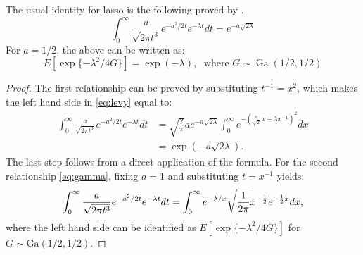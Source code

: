 \documentclass[letterpaper,11pt]{article}
\begin{document}
\begin{remark}
The usual identity for lasso is the following proved by \citet{levy1940certains}.
\begin{equation}
  \int_{0}^{\infty} \frac{a}{\sqrt{2\pi t^3}} e^{-a^2/2t} e^{-\lambda t} dt = e^{-a\sqrt{2\lambda}} \label{eq:levy}
\end{equation}
For $a = 1/2$, the above can be written as: 
\begin{equation}
  E \left[\exp\{-\lambda^2/4 G \} \right] = \exp(-\lambda), \; \text{ where } G \sim \operatorname{Ga} (1/2, 1/2) \label{eq:gamma}
\end{equation}
\end{remark}
\begin{proof}
The first relationship can be proved by substituting $t^{-1} = x^2$, which makes the left hand side in \eqref{eq:levy} equal to: 
\begin{align*}
\int_{0}^{\infty} \frac{a}{\sqrt{2\pi t^3}} e^{-a^2/2t} e^{-\lambda t} dt & = \sqrt{\frac{2}{\pi}} a e^{-a\sqrt{2\lambda}} \int_0^{\infty} e^{-\left(\frac{a}{\sqrt{2}} x - \lambda x^{-1}\right)^2} dx \\
& = \exp(-a\sqrt{2\lambda}).
\end{align*}
The last step follows from a direct application of the \CS formula. For the second relationship \eqref{eq:gamma}, fixing $a = 1$ and substituting $t = x^{-1}$ yields: 
$$
\int_{0}^{\infty} \frac{a}{\sqrt{2\pi t^3}} e^{-a^2/2t} e^{-\lambda t} dt = \int_{0}^{\infty} e^{-\lambda / x} \sqrt{\frac{1}{2\pi}} x^{-\frac{1}{2}} e^{-\frac{1}{2} x} dx, 
$$
where the left hand side can be identified as $E \left[\exp\{-\lambda^2/4 G \} \right]$ for $G \sim \mbox{Ga}(1/2,1/2)$. \qedhere
\end{proof}
\end{document}
